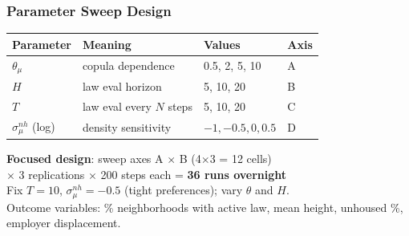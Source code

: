 \documentclass{beamer}
\begin{document}
\begin{frame}
  \frametitle{Parameter Sweep Design}
  \begin{center}
  \renewcommand{\arraystretch}{1.3}
  \begin{tabular}{llll}
    \toprule
    \textcolor{nimbygray}{Parameter} & \textcolor{nimbygray}{Meaning} & \textcolor{nimbygray}{Values} & \textcolor{nimbygray}{Axis} \\
    \midrule
    $\theta_\mu$ & copula dependence & 0.5, 2, 5, 10 & A \\
    $H$ & law eval horizon & 5, 10, 20 & B \\
    $T$ & law eval every $N$ steps & 5, 10, 20 & C \\
    $\sigma^{nh}_\mu$ (log) & density sensitivity & $-1, -0.5, 0, 0.5$ & D \\
    \bottomrule
  \end{tabular}
  \end{center}
  \vspace{0.5em}
  \textbf{Focused design}: sweep axes A $\times$ B (4$\times$3 = 12 cells)\\
  $\times$ 3 replications $\times$ 200 steps each = \textbf{36 runs overnight}\\[0.3em]
  Fix $T=10$, $\sigma^{nh}_\mu = -0.5$ (tight preferences); vary $\theta$ and $H$.\\[0.5em]
  \small Outcome variables: \% neighborhoods with active law, mean height, unhoused \%, employer displacement.
\end{frame}
\end{document}
